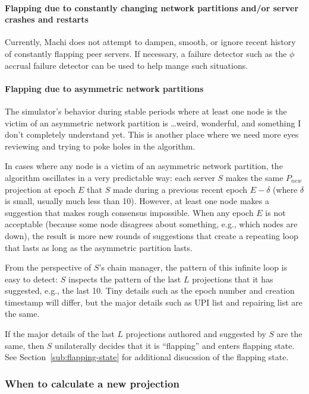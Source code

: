 \documentclass[preprint,10pt]{sigplanconf}
\begin{document}
\paragraph{Flapping due to constantly changing network partitions and/or server crashes and restarts}

Currently, Machi does not attempt to dampen, smooth, or ignore recent
history of constantly flapping peer servers.  If necessary, a failure
detector such as the $\phi$ accrual failure detector
\cite{phi-accrual-failure-detector} can be used to help mange such
situations.

\paragraph{Flapping due to asymmetric network partitions}

The simulator's behavior during stable periods where at least one node
is the victim of an asymmetric network partition is \ldots weird,
wonderful, and something I don't completely understand yet.  This is
another place where we need more eyes reviewing and trying to poke
holes in the algorithm.

In cases where any node is a victim of an asymmetric network
partition, the algorithm oscillates in a very predictable way: each
server $S$ makes the same $P_{new}$ projection at epoch $E$ that $S$ made
during a previous recent epoch $E-\delta$ (where $\delta$ is small, usually
much less than 10).  However, at least one node makes a suggestion that
makes rough consensus impossible.  When any epoch $E$ is not
acceptable (because some node disagrees about something, e.g.,
which nodes are down),
the result is more new rounds of suggestions that create a repeating
loop that lasts as long as the asymmetric partition lasts.

From the perspective of $S$'s chain manager, the pattern of this
infinite loop is easy to detect: $S$ inspects the pattern of the last
$L$ projections that it has suggested, e.g., the last 10.
Tiny details such as the epoch number and creation timestamp will
differ, but the major details such as UPI list and repairing list are
the same.

If the major details of the last $L$ projections authored and
suggested by $S$ are the same, then $S$ unilaterally decides that it
is ``flapping'' and enters flapping state.  See
Section~\ref{sub:flapping-state} for additional disucssion of the
flapping state.

\subsubsection{When to calculate a new projection}
\label{ssub:when-to-calc}
\end{document}
